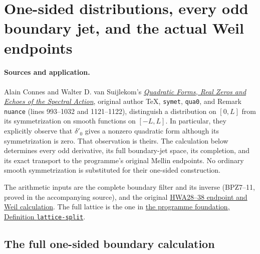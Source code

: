 \section{One-sided distributions, every odd boundary jet, and the actual Weil endpoints}
\label{sec:one-sided-boundary-jets}

\paragraph{Sources and application.}
Alain Connes and Walter D. van Suijlekom's
\href{https://arxiv.org/abs/2511.23257v1}{\emph{Quadratic Forms, Real Zeros
and Echoes of the Spectral Action}}, original author TeX,
\texttt{symet}, \texttt{qua0}, and Remark \texttt{nuance}
(lines 993--1032 and 1121--1122), distinguish a distribution on
$[0,L]$ from its symmetrization on smooth functions on $[-L,L]$.
In particular, they explicitly observe that $\delta'_0$ gives a nonzero
quadratic form although its symmetrization is zero. That observation
is theirs. The calculation below determines every odd derivative,
its full boundary-jet space, its completion, and its exact transport
to the programme's original Mellin endpoints. No ordinary smooth
symmetrization is substituted for their one-sided construction.

The arithmetic inputs are the complete boundary filter and its inverse
(BPZ7--11, proved in the accompanying source), and the original
\href{https://github.com/KokunoYumeto/zeta-function-research-reader/blob/569ffbdc3308aeee9db7dc72cfa6d21918736967/workbenches/splitzero-tandem/branches/tau-zero-prime-positivity/HOLONOMY_AVERAGING_WEIL_ENDPOINT_DERIVATION.md}{HWA28--38
endpoint and Weil calculation}. The full lattice is the one in
\href{https://github.com/KokunoYumeto/zeta-function-research-reader/blob/a2851f9eb352e7e4376bc629de86fa4ed9c1c434/workbenches/splitzero-tandem/foundations/split-support-geometry-v11/split_support_geometry_arithmetic_curve_v11.tex}{the
programme foundation, Definition \texttt{lattice-split}}.

\subsection{The full one-sided boundary calculation}

